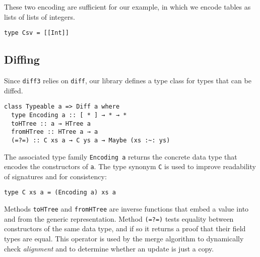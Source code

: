 \documentclass{sigplanconf}
\theoremstyle{plain}
\begin{document}
These two encoding are sufficient for our example, in
which we encode tables as lists of lists of integers.
\begin{verbatim}
type Csv = [[Int]]
\end{verbatim} 

\subsection{Diffing}
Since \texttt{diff3} relies on \texttt{diff}, our library
defines a type class for types that can be diffed.

\begin{verbatim}
class Typeable a => Diff a where
  type Encoding a :: [ * ] → * → *
  toHTree :: a → HTree a
  fromHTree :: HTree a → a
  (=?=) :: C xs a → C ys a → Maybe (xs :~: ys)
\end{verbatim}
The associated type family \texttt{Encoding a} returns the concrete
data type that encodes the constructors of \texttt{a}.
%
The type synonym \texttt{C} is used to improve readability of signatures
and for consistency:
\begin{verbatim}
type C xs a = (Encoding a) xs a
\end{verbatim}
%
Methods \texttt{toHTree} and \texttt{fromHTree} are inverse functions
that embed a value into and from the generic representation.
% 
%
%
%
%
Method \texttt{(=?=)} tests equality between constructors of the same
data type, and if so it returns a proof that their field types are
equal. This operator is used by the merge algorithm to dynamically
check \emph{alignment} and to determine whether an update is just a copy.
%
\end{document}
